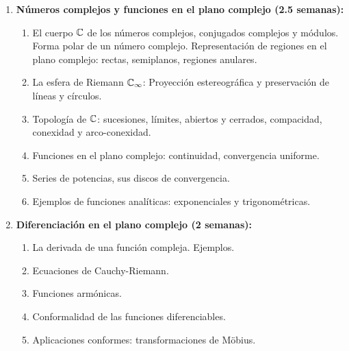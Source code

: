 \begin{refsection}
\begin{enumerate}
\item \textbf{Números complejos y funciones en el plano complejo (2.5 semanas):} 
\begin{enumerate}
    \item El cuerpo $\mathbb{C}$ de los números complejos, conjugados complejos y módulos. Forma polar de un número complejo. Representación de regiones en el plano complejo: rectas, semiplanos, regiones anulares.

    \item La esfera de Riemann $\mathbb{C}_{\infty}$: Proyección estereográfica y preservación de líneas y círculos.

    \item Topología de $\mathbb{C}$: sucesiones, límites, abiertos y cerrados, compacidad, conexidad y arco-conexidad. 

    \item Funciones en el plano complejo: continuidad, convergencia uniforme.
    
    \item Series de potencias, sus discos de convergencia.
    
    \item Ejemplos de funciones analíticas: exponenciales y  trigonométricas.
\end{enumerate}

\item \textbf{Diferenciación en el plano complejo (2 semanas):} 
\begin{enumerate}
    \item La derivada de una función compleja. Ejemplos.
    \item Ecuaciones de Cauchy-Riemann. 
    \item Funciones armónicas.
    \item Conformalidad de las funciones diferenciables.
    \item Aplicaciones conformes: transformaciones de Möbius.
\end{enumerate}


\end{enumerate}
\end{refsection}
